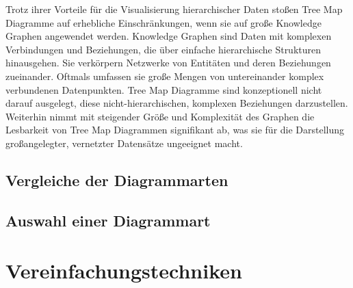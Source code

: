 Trotz ihrer Vorteile für die Visualisierung hierarchischer Daten stoßen Tree Map Diagramme auf erhebliche Einschränkungen, wenn sie auf große Knowledge Graphen angewendet werden. Knowledge Graphen sind Daten mit komplexen Verbindungen und Beziehungen, die über einfache hierarchische Strukturen hinausgehen. Sie verkörpern Netzwerke von Entitäten und deren Beziehungen zueinander. Oftmals umfassen sie große Mengen von untereinander komplex verbundenen Datenpunkten. Tree Map Diagramme sind konzeptionell nicht darauf ausgelegt, diese nicht-hierarchischen, komplexen Beziehungen darzustellen. Weiterhin nimmt mit steigender Größe und Komplexität des Graphen die Lesbarkeit von Tree Map Diagrammen signifikant ab, was sie für die Darstellung großangelegter, vernetzter Datensätze ungeeignet macht.

\subsection{Vergleiche der Diagrammarten}

\subsection{Auswahl einer Diagrammart}

\section{Vereinfachungstechniken}